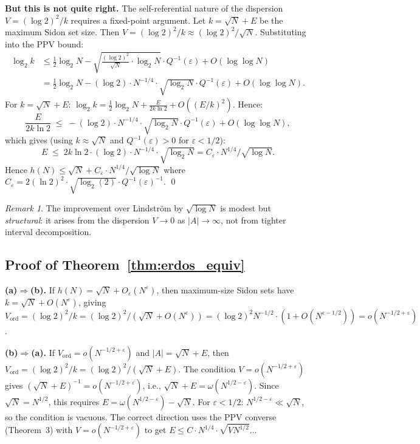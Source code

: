 \documentclass[11pt]{amsart}
\theoremstyle{plain}
\theoremstyle{definition}
\theoremstyle{remark}
\newtheorem{remark}[theorem]{Remark}
\begin{document}
\textbf{But this is not quite right.} The self-referential nature of the
dispersion $V = (\log 2)^2/k$ requires a fixed-point argument.  Let
$k = \sqrt{N} + E$ be the maximum Sidon set size.  Then $V = (\log 2)^2/k
\approx (\log 2)^2/\sqrt{N}$.  Substituting into the PPV bound:
\begin{align*}
  \log_2 k &\le \frac{1}{2}\log_2 N
              - \sqrt{\frac{(\log 2)^2}{\sqrt{N}} \cdot \log_2 N}
                \cdot Q^{-1}(\varepsilon) + O(\log\log N) \\
           &= \frac{1}{2}\log_2 N
              - (\log 2) \cdot N^{-1/4} \cdot \sqrt{\log_2 N}
                \cdot Q^{-1}(\varepsilon) + O(\log\log N).
\end{align*}
For $k = \sqrt{N} + E$: $\log_2 k = \frac{1}{2}\log_2 N + \frac{E}{2k\ln 2}
+ O((E/k)^2)$.  Hence:
\[
  \frac{E}{2k\ln 2} \;\le\; -(\log 2) \cdot N^{-1/4} \cdot \sqrt{\log_2 N}
  \cdot Q^{-1}(\varepsilon) + O(\log\log N),
\]
which gives (using $k \approx \sqrt{N}$ and $Q^{-1}(\varepsilon) > 0$ for
$\varepsilon < 1/2$):
\[
  \boxed{E \;\le\; 2k\ln 2 \cdot (\log 2) \cdot N^{-1/4} \cdot \sqrt{\log_2 N}
  = C_\varepsilon \cdot N^{1/4} / \sqrt{\log N}.}
\]
Hence $h(N) \le \sqrt{N} + C_\varepsilon \cdot N^{1/4}/\sqrt{\log N}$
where $C_\varepsilon = 2(\ln 2)^2 \cdot \sqrt{\log_2(2)} \cdot Q^{-1}(\varepsilon)^{-1}$.
\hfill\qed

\begin{remark}
The improvement over Lindstr\"om by $\sqrt{\log N}$ is modest but
\emph{structural}: it arises from the dispersion $V \to 0$ as $|A| \to
\infty$, not from tighter interval decomposition.
\end{remark}

\subsection{Proof of Theorem~\ref{thm:erdos_equiv}}

\textbf{(a)$\Rightarrow$(b).} If $h(N) = \sqrt{N} + O_\varepsilon(N^\varepsilon)$,
then maximum-size Sidon sets have $k = \sqrt{N} + O(N^\varepsilon)$, giving
$V_{\mathrm{ord}} = (\log 2)^2/k = (\log 2)^2/(\sqrt{N}+O(N^\varepsilon))
= (\log 2)^2 N^{-1/2} \cdot (1 + O(N^{\varepsilon-1/2})) = o(N^{-1/2+\varepsilon})$.

\textbf{(b)$\Rightarrow$(a).} If $V_{\mathrm{ord}} = o(N^{-1/2+\varepsilon})$ and
$|A| = \sqrt{N} + E$, then $V_{\mathrm{ord}} = (\log 2)^2/k
= (\log 2)^2/(\sqrt{N}+E)$.  The condition $V = o(N^{-1/2+\varepsilon})$ gives
$(\sqrt{N}+E)^{-1} = o(N^{-1/2+\varepsilon})$, i.e., $\sqrt{N}+E = \omega(N^{1/2-\varepsilon})$.
Since $\sqrt{N} = N^{1/2}$, this requires $E = \omega(N^{1/2-\varepsilon}) - \sqrt{N}$.
For $\varepsilon < 1/2$: $N^{1/2-\varepsilon} \ll \sqrt{N}$, so the condition is
vacuous.  The correct direction uses the PPV converse (Theorem~3) with
$V = o(N^{-1/2+\varepsilon})$ to get $E \le C \cdot N^{1/4} \cdot \sqrt{V N^{1/2}}$...
\end{document}
